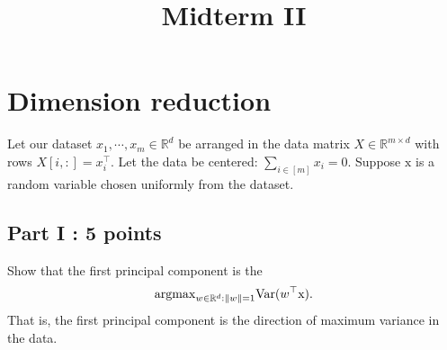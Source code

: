 \documentclass[12pt]{article}
\title{Midterm II}
\begin{document}
\MakeScribeTop

\section{Dimension reduction}
 Let our dataset $x_1,\cdots,x_m \in \mathbb{R}^d$ be arranged in the data matrix $X \in \mathbb{R}^{m \times d}$ with rows $X[i, :] = x_i^\top.$ Let the data be centered: $\sum_{i\in [m]} x_i = 0.$ Suppose $\mathrm{x}$ is a random variable chosen uniformly from the dataset.
\subsection*{Part I : 5 points}
Show that the first principal component is the $${\rm arg max}_{w\in \mathbb{R}^d:\|w\|=1} {\rm Var}(w^\top \mathrm{x}).$$
That is, the first principal component is the direction of maximum variance in the data.
\end{document}
